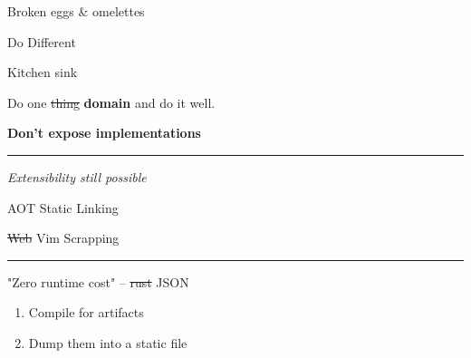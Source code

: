 \documentclass{beamer}
\begin{document}
\begin{frame}[standout]

	Broken eggs \& omelettes

\end{frame}


\begin{frame}{Do Different}

	\begin{block}{Kitchen sink}

		\vspace{0.5em}

		Do one \st{thing} \textbf{domain} and do it well.

		\vspace{0.5em}

		\textbf{Don't expose implementations}

	\end{block}

	\rule{\textwidth}{0.1em}

	\textit{Extensibility still possible}

\end{frame}


\begin{frame}{AOT Static Linking}

	\st{Web} Vim Scrapping

	\rule{\textwidth}{0.1em}

	"Zero runtime cost" -- \st{rust} JSON

	\begin{enumerate}

		\item Compile  for artifacts

		\item Dump them into a static file

	\end{enumerate}

\end{frame}
\end{document}
